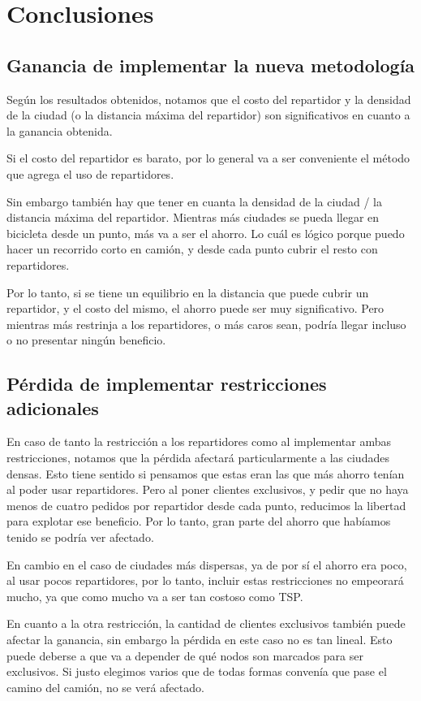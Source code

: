 \documentclass{article}
\begin{document}
    \section{Conclusiones}
    \subsection{Ganancia de implementar la nueva metodología}
    Según los resultados obtenidos, notamos que el costo del repartidor y la densidad de la ciudad (o la distancia máxima del repartidor) son significativos en cuanto a la ganancia obtenida.

    Si el costo del repartidor es barato, por lo general va a ser conveniente el método que agrega el uso de repartidores.

    Sin embargo también hay que tener en cuanta la densidad de la ciudad / la distancia máxima del repartidor. Mientras más ciudades se pueda llegar en bicicleta desde un punto, más va a ser el ahorro. Lo cuál es lógico porque puedo hacer un recorrido corto en camión, y desde cada punto cubrir el resto con repartidores.

    Por lo tanto, si se tiene un equilibrio en la distancia que puede cubrir un repartidor, y el costo del mismo, el ahorro puede ser muy significativo. Pero mientras más restrinja a los repartidores, o más caros sean, podría llegar incluso o no presentar ningún beneficio.

    \subsection{Pérdida de implementar restricciones adicionales}
    En caso de tanto la restricción a los repartidores como al implementar ambas restricciones, notamos que la pérdida afectará particularmente a las ciudades densas. Esto tiene sentido si pensamos que estas eran las que más ahorro tenían al poder usar repartidores. Pero al poner clientes exclusivos, y pedir que no haya menos de cuatro pedidos por repartidor desde cada punto, reducimos la libertad para explotar ese beneficio. Por lo tanto, gran parte del ahorro que habíamos tenido se podría ver afectado.

    En cambio en el caso de ciudades más dispersas, ya de por sí el ahorro era poco, al usar pocos repartidores, por lo tanto, incluir estas restricciones no empeorará mucho, ya que como mucho va a ser tan costoso como TSP.
    
    En cuanto a la otra restricción, la cantidad de clientes exclusivos también puede afectar la ganancia, sin embargo la pérdida en este caso no es tan lineal. Esto puede deberse a que va a depender de qué nodos son marcados para ser exclusivos. Si justo elegimos varios que de todas formas convenía que pase el camino del camión, no se verá afectado.
\end{document}
